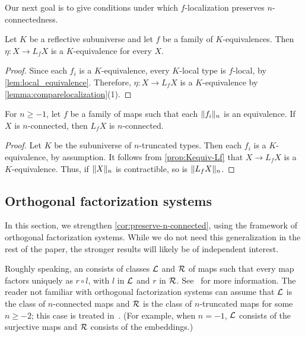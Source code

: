 \medskip

Our next goal is to give conditions under which $f$-localization
preserves $n$-connected\-ness.

\begin{prp}\label{prop:Kequiv-Lf}
Let $K$ be a reflective subuniverse and let $f$ be a family of $K$-equiva\-lences.
Then $\eta : X \to L_f X$ is a $K$-equivalence for every $X$.
\end{prp}

\begin{proof}
Since each $f_i$ is a $K$-equivalence, every $K$-local type is $f$-local,
by \cref{lem:local_equivalence}.
Therefore, $\eta : X \to L_f X$ is a $K$-equivalence
by \cref{lemma:comparelocalization}(1).
\end{proof}

\begin{cor}\label{cor:preserve-n-connected}
For $n \geq -1$, let $f$ be a family of maps such that each $\trunc{n}{f_i}$ is an equivalence.
If $X$ is $n$-connected, then $L_f X$ is $n$-connected.
\end{cor}

\begin{proof}
Let $K$ be the subuniverse of $n$-truncated types.
Then each $f_i$ is a $K$-equivalence, by assumption.
It follows from \cref{prop:Kequiv-Lf} that $X \to L_f X$ is a $K$-equivalence.
Thus, if $\trunc{n}{X}$ is contractible, so is $\trunc{n}{L_f X}$.
\end{proof}

\subsection{Orthogonal factorization systems}\label{ss:orthogonal-factorization-systems}

In this section, we strengthen \cref{cor:preserve-n-connected}, using
the framework of orthogonal factorization systems.
While we do not need this generalization in the rest of the paper,
the stronger results will likely be of independent interest.

Roughly speaking, an  consists of
classes $\LLL$ and $\RRR$ of maps such that every map factors uniquely as
$r \circ l$, with $l$ in $\LLL$ and $r$ in $\RRR$.
See~\cite{RijkeShulmanSpitters} for more information.
The reader not familiar with orthogonal factorization systems can assume
that $\LLL$ is the class of $n$-connected maps
and $\RRR$ is the class of $n$-truncated maps for some $n \geq -2$;
this case is treated in~\cite[Section 7.6]{hottbook}.
(For example, when $n = -1$, $\LLL$ consists of the surjective maps
and $\RRR$ consists of the embeddings.)


